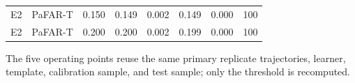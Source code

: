 \begin{table}[tbp]
{\begin{tabular}{llrrrrrr}
E2 & PaFAR-T & 0.150 & 0.149 & 0.002 & 0.149 & 0.000 & 100 \\
E2 & PaFAR-T & 0.200 & 0.200 & 0.002 & 0.199 & 0.000 & 100 \\
\bottomrule
\end{tabular}
}
\vspace{0.35em}
\begin{minipage}{\linewidth}
\footnotesize
\noindent The five operating points reuse the same primary replicate trajectories, learner, template, calibration sample, and test sample; only the threshold is recomputed.\par
\end{minipage}
\end{table}
